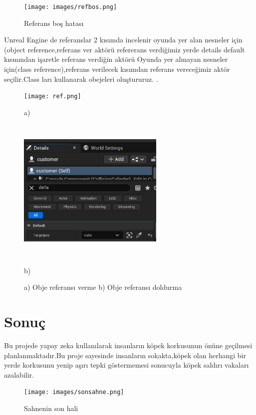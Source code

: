 \documentclass[12pt,a4paper]{article}
\begin{document}
\begin{enumerate}
			\begin{figure}[!htbp]
				\texttt{[image: images/refbos.png]}
				\caption{Referans boş hatası}
				\label{fig:ornek}
			\end{figure}
		 Unreal Engine de referanslar 2 kısımda incelenir oyunda yer alan nesneler için (object reference,referans ver aktörü refererans verdiğimiz yerde details default  kısmından işaretle referans verdiğin aktörü Oyunda yer almayan nesneler için(class reference),referans verilecek kısımdan referans vereceğimiz aktör seçilir.Class ları kullanarak obejeleri oluştururuz. \cite{ref}.
		 	 	
		 	\begin{figure}[!htbp]
		 		\centering
		 		\begin{minipage}{0.45\textwidth}
		 			\centering
		 			\texttt{[image: ref.png]}
		 			\caption*{a)}
		 		\end{minipage}
		 		\hfill
		 		\begin{minipage}{0.45\textwidth}
		 			\centering
		 			\includegraphics[width=7cm,height=7cm,keepaspectratio]{içidoldur.png}\newline
		 			\caption*{b)}
		 		\end{minipage}
		 		\caption{a) Obje referansı verme  b) Obje referansı doldurma}
		 	\end{figure}
		
		 \end{enumerate}
		
	 \section{Sonuç}
	Bu projede yapay zeka kullanılarak insanların köpek korkusunun önüne geçilmesi planlanmaktadır.Bu proje sayesinde insanların sokakta,köpek olan herhangi bir yerde korkusunu yenip aşırı tepki göstermemesi sonucuyla köpek saldırı vakaları azalabilir.
	\begin{figure}[!htbp]
		\texttt{[image: images/sonsahne.png]}
		\caption{Sahnenin son hali}
		\label{fig:ornek} 
	\end{figure}

	
	
	 
\end{document}
